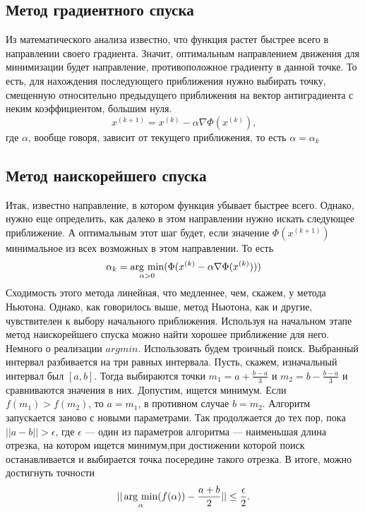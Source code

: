 \documentclass[a4paper, 12pt]{article}
\newcommand{\argmin}{\mathop{\rm arg~min}\limits}
\begin{document}
\subsection*{Метод градиентного спуска}
Из математического анализа известно, что функция растет быстрее всего в направлении
своего градиента. Значит, оптимальным направлением движения для минимизации будет направление, 
противоположное градиенту в данной точке. То есть, 
для нахождения последующего приближения нужно выбирать точку, смещенную относительно предыдущего
приближения на вектор антиградиента с неким коэффициентом, большим нуля.
\begin{equation}
	x^{(k+1)} = x^{(k)} - \alpha \nabla \Phi(x^{(k)}) \text{,}
\end{equation}
где $\alpha$, вообще говоря, зависит от текущего приближения, то есть $\alpha = \alpha_k$
\subsection*{Метод наискорейшего спуска}
Итак, известно направление, в котором функция убывает быстрее всего. Однако, нужно
еще определить, как далеко в этом направлении нужно искать следующее приближение.
А оптимальным этот шаг будет, если значение $\Phi(x^{(k+1)})$ минимальное из всех возможных в этом направлении.
То есть 
\begin{equation}
	\alpha_k = \argmin_{\alpha > 0} (\Phi(x^{(k)} - \alpha \nabla \Phi(x^{(k)})))
\end{equation}
Сходимость этого метода линейная, что медленнее, чем, скажем, у метода Ньютона. Однако, как
говорилось выше, метод Ньютона, как и другие, чувствителен к выбору начального приближения.
Используя на начальном этапе метод наискорейшего спуска можно найти хорошее приближение для него.\\
Немного о реализации $argmin$. Использовать будем троичный поиск. Выбранный интервал разбивается на три равных интервала.
Пусть, скажем, изначальный интервал был $[a,b]$. Тогда выбираются точки $m_1 = a+\frac{b-a}{3}$ и $m_2 = b-\frac{b-a}{3}$ и сравниваются значения в них.
Допустим, ищется минимум. Если $f(m_1) > f(m_2)$, то $a = m_1$, в противном случае $b = m_2$. Алгоритм запускается заново с новыми параметрами.
Так продолжается до тех пор, пока $||a - b|| > \epsilon$, где $\epsilon$ --- один из параметров алгоритма --- наименьшая длина отрезка, на котором ищется минимум,при достижении которой поиск останавливается и выбирается точка посередине такого отрезка. В итоге, можно достигнуть точности
\begin{equation*}
	||\argmin_{\alpha}(f(\alpha)) - \frac{a+b}{2}|| \leq \frac{\epsilon}{2}.
\end{equation*}
\end{document}
